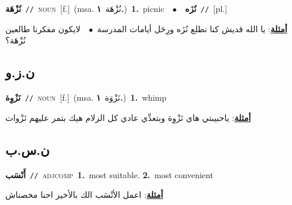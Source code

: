 \documentclass[10pt,a4paper,twoside]{article} %
\begin{document}
\begin{multicols}{2}
{\setlength\topsep{0pt}\textbf{\foreignlanguage{arabic}{نُزْهَة}}\ {\color{gray}\texttt{//}\color{black}}\ \textsc{noun}\ [f.]\ \color{gray}(msa. \foreignlanguage{arabic}{نُزْهَة}~\foreignlanguage{arabic}{\textbf{١.}})\color{black}\ \textbf{1.}~picnic\ \ $\bullet$\ \ \setlength\topsep{0pt}\textbf{\foreignlanguage{arabic}{نُزَه}}\ {\color{gray}\texttt{//}\color{black}}\ [pl.]\  \begin{flushright}\color{gray}\foreignlanguage{arabic}{\textbf{\underline{\foreignlanguage{arabic}{أمثلة}}}: يا الله قديش كنا نطلع نُزَه ورِحَل أيامات المدرسة\ $\bullet$\ \  لايكون مفكرنا طالعين نُزْهَة؟}\end{flushright}\color{black}} \vspace{2mm}

\vspace{-3mm}
\subsection*{\color{blue}\foreignlanguage{arabic}{ن.ز.و}\color{blue}{}} 

{\setlength\topsep{0pt}\textbf{\foreignlanguage{arabic}{نَزْوِة}}\ {\color{gray}\texttt{//}\color{black}}\ \textsc{noun}\ [f.]\ \color{gray}(msa. \foreignlanguage{arabic}{نَزْوَة}~\foreignlanguage{arabic}{\textbf{١.}})\color{black}\ \textbf{1.}~whimp\  \begin{flushright}\color{gray}\foreignlanguage{arabic}{\textbf{\underline{\foreignlanguage{arabic}{أمثلة}}}: ياحبيبتي هاي نَزْوِة وبتعدِّي عادي كل الزلام هيك بتمر عليهم نَزْوات}\end{flushright}\color{black}} \vspace{2mm}

\vspace{-3mm}
\subsection*{\color{blue}\foreignlanguage{arabic}{ن.س.ب}\color{blue}{}} 

{\setlength\topsep{0pt}\textbf{\foreignlanguage{arabic}{أَنْسَب}}\ {\color{gray}\texttt{//}\color{black}}\ \textsc{adj\textunderscore comp}\ \textbf{1.}~most suitable.  \textbf{2.}~most convenient\  \begin{flushright}\color{gray}\foreignlanguage{arabic}{\textbf{\underline{\foreignlanguage{arabic}{أمثلة}}}: اعمل الأنْسَب الك بالأخير احنا مخصناش}\end{flushright}\color{black}} \vspace{2mm}


\end{multicols}
\end{document}
